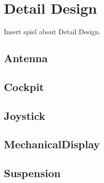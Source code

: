 

\chapter{Detail Design}

Insert spiel about Detail Design.

\section{Antenna}


\section{Cockpit}


\section{Joystick}


\section{MechanicalDisplay}


\section{Suspension}

